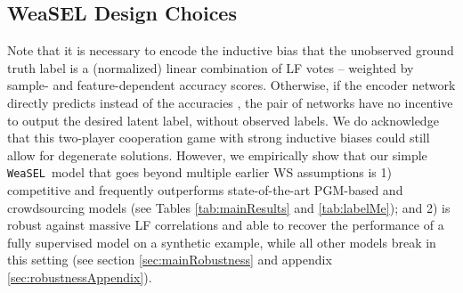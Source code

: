 \documentclass{article}
\newcommand{\weasel}{\texttt{WeaSEL}}\newcommand{\brackets}[1]{\left( #1 \right)}
\begin{document}
\subsection{WeaSEL Design Choices}
\vspace{-2mm}
Note that it is necessary to encode the inductive bias that the unobserved ground truth label  is a (normalized) linear combination of LF votes -- weighted by sample- and feature-dependent accuracy scores. Otherwise, if the encoder network directly predicts  instead of the accuracies , the pair of networks  have no incentive to output the desired latent label, without observed labels.  We do acknowledge that this two-player cooperation game with strong inductive biases could still allow for degenerate solutions. However, we empirically show that our simple \weasel\  model that goes beyond multiple earlier WS assumptions is 1) competitive and frequently outperforms state-of-the-art PGM-based and crowdsourcing models (see Tables \ref{tab:mainResults} and \ref{tab:labelMe}); and 2) is robust against massive LF correlations and able to recover the performance of a fully supervised model on a synthetic example, while all other models break in this setting (see section \ref{sec:mainRobustness} and appendix \ref{sec:robustnessAppendix}).  
\end{document}
